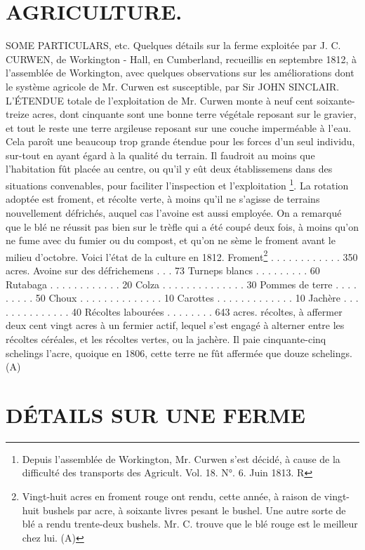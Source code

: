 \setcounter{page}{201} \section{AGRICULTURE.}
SOME PARTICULARS, etc. Quelques détails sur la ferme exploitée par J. C. CURWEN, de Workington - Hall, en Cumberland, recueillis en septembre 1812, à l'assemblée de Workington, avec quelques observations sur les améliorations dont le système agricole de Mr. Curwen est susceptible, par Sir JOHN SINCLAIR.
L'ÉTENDUE totale de l'exploitation de Mr. Curwen monte à neuf cent soixante-treize acres, dont cinquante sont une bonne terre végétale reposant sur le gravier, et tout le reste une terre argileuse reposant sur une couche imperméable à l'eau. Cela paroît une beaucoup trop grande étendue pour les forces d'un seul individu, sur-tout en ayant égard à la qualité du terrain. Il faudroit au moins que l'habitation fût placée au centre, ou qu'il y eût deux établissemens dans des situations convenables, pour faciliter l'inspection et l'exploitation \footnote{Depuis l'assemblée de Workington, Mr. Curwen s'est décidé, à cause de la difficulté des transports des Agricult. Vol. 18. N°. 6. Juin 1813. R}.\setcounter{page}{202} La rotation adoptée est froment, et récolte verte, à moins qu'il ne s'agisse de terrains nouvellement défrichés, auquel cas l'avoine est aussi employée. On a remarqué que le blé ne réussit pas bien sur le trèfle qui a été coupé deux fois, à moins qu'on ne fume avec du fumier ou du compost, et qu'on ne sème le froment avant le milieu d'octobre. Voici l'état de la culture en 1812.
Froment\footnote{Vingt-huit acres en froment rouge ont rendu, cette année, à raison de vingt-huit bushels par acre, à soixante livres pesant le bushel. Une autre sorte de blé a rendu trente-deux bushels. Mr. C. trouve que le blé rouge est le meilleur chez lui. (A)} . . . . . . . . . . . . 350 acres.
Avoine sur des défrichemens . . . 73
Turneps blancs . . . . . . . . . 60
Rutabaga . . . . . . . . . . . . 20
Colza . . . . . . . . . . . . . . 30
Pommes de terre . . . . . . . . . 50
Choux . . . . . . . . . . . . . . 10
Carottes . . . . . . . . . . . . . 10
Jachère . . . . . . . . . . . . . . 40
Récoltes labourées . . . . . . . . 643 acres.
récoltes, à affermer deux cent vingt acres à un fermier actif, lequel s'est engagé à alterner entre les récoltes céréales, et les récoltes vertes, ou la jachère. Il paie cinquante-cinq schelings l'acre, quoique en 1806, cette terre ne fût affermée que douze schelings. (A)\setcounter{page}{203} \section{DÉTAILS SUR UNE FERME}
